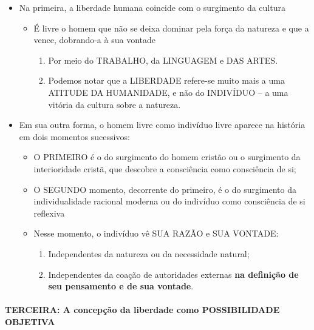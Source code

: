 \documentclass[
]{book}
\providecommand{\tightlist}{%
  \setlength{\itemsep}{0pt}\setlength{\parskip}{0pt}}
\begin{document}
\begin{itemize}
  \begin{itemize}
  \tightlist
  \item
    Na primeira, a liberdade humana coincide com o surgimento da cultura

    \begin{itemize}
    \tightlist
    \item
      É livre o homem que não se deixa dominar pela força da natureza e que a vence, dobrando-a à sua vontade

      \begin{enumerate}
      \def\labelenumi{\alph{enumi}.}
      \tightlist
      \item
        Por meio do TRABALHO, da LINGUAGEM e DAS ARTES.
      \item
        Podemos notar que a LIBERDADE refere-se muito mais a uma ATITUDE DA HUMANIDADE, e não do INDIVÍDUO -- a uma vitória da cultura sobre a natureza.
      \end{enumerate}
    \end{itemize}
  \item
    Em sua outra forma, o homem livre como indivíduo livre aparece na história em dois momentos sucessivos:

    \begin{itemize}
    \tightlist
    \item
      O PRIMEIRO é o do surgimento do homem cristão ou o surgimento da interioridade cristã, que descobre a consciência como consciência de si;
    \item
      O SEGUNDO momento, decorrente do primeiro, é o do surgimento da individualidade racional moderna ou do indivíduo como consciência de si reflexiva
    \item
      Nesse momento, o indivíduo vê SUA RAZÃO e SUA VONTADE:

      \begin{enumerate}
      \def\labelenumi{\alph{enumi}.}
      \tightlist
      \item
        Independentes da natureza ou da necessidade natural;
      \item
        Independentes da coação de autoridades externas \textbf{na definição de seu pensamento e de sua vontade}.
      \end{enumerate}
    \end{itemize}
  \end{itemize}
\end{itemize}

\hypertarget{terceira-a-concepuxe7uxe3o-da-liberdade-como-possibilidade-objetiva}{%
\paragraph{TERCEIRA: A concepção da liberdade como POSSIBILIDADE OBJETIVA}\label{terceira-a-concepuxe7uxe3o-da-liberdade-como-possibilidade-objetiva}}
\end{document}
